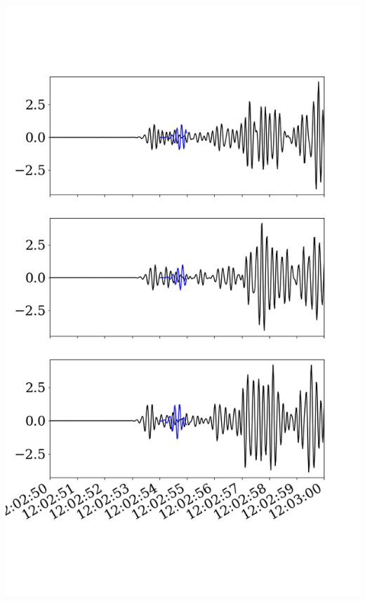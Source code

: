 \documentclass{beamer}
\begin{document}
\begin{frame}
\begin{minipage}{0.4\linewidth}
    \includegraphics[width=1.2\linewidth]{images/fig_4.png}
 \end{minipage}
 
\end{frame}
\end{document}
